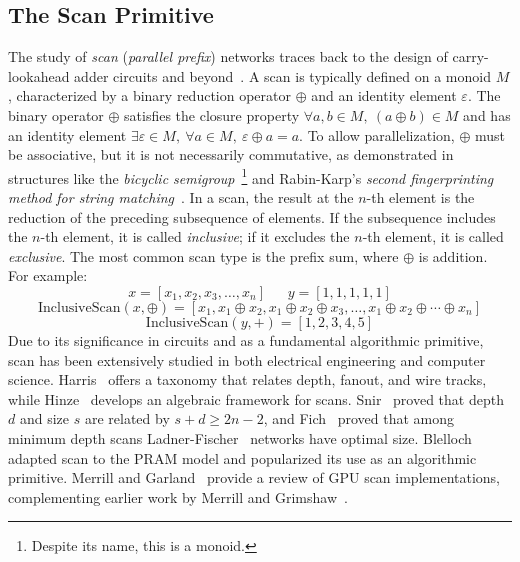 \documentclass[sigconf,screen]{acmart}
\begin{document}
\subsection{The Scan Primitive}
\label{sec:the-scan-primitive}
The study of \emph{scan} (\emph{parallel prefix}) networks traces back to the design of carry-lookahead adder circuits and beyond~\cite{5219801,10.5555/1098666}. A scan is typically defined on a monoid \( M \), characterized by a binary reduction operator \( \oplus \) and an identity element \( \varepsilon \). The binary operator \( \oplus \) satisfies the closure property \( \forall a, b \in M, \ (a \oplus b) \in M \) and has an identity element \( \exists \varepsilon \in M, \ \forall a \in M, \ \varepsilon \oplus a = a \). To allow parallelization, \( \oplus \) must be associative, but it is not necessarily commutative, as demonstrated in structures like the \emph{bicyclic semigroup}~\cite{Clifford1961}\footnote{Despite its name, this is a monoid.} and Rabin-Karp's \emph{second fingerprinting method for string matching}~\cite[Section 6]{Karp:1987:ERP}. In a scan, the result at the \( n \)-th element is the reduction of the preceding subsequence of elements. If the subsequence includes the \( n \)-th element, it is called \emph{inclusive}; if it excludes the \( n \)-th element, it is called \emph{exclusive}. The most common scan type is the prefix sum, where \( \oplus \) is addition. For example:
\[
  x = [x_1, x_2, x_3, \dots, x_n] \ \ \ \ \ \ \ y = [1, 1, 1, 1, 1]
\]
\[
  \text{InclusiveScan}(x, \oplus) = [x_1, x_1 \oplus x_2, x_1 \oplus x_2 \oplus x_3, \dots, x_1 \oplus x_2 \oplus \cdots \oplus x_n]
\]
\[
  \text{InclusiveScan}(y, +) = [1, 2, 3, 4, 5]
\]
Due to its significance in circuits and as a fundamental algorithmic primitive, scan has been extensively studied in both electrical engineering and computer science. Harris~\cite{1292373} offers a taxonomy that relates depth, fanout, and wire tracks, while Hinze~\cite{10.1007/978-3-540-27764-4_11} develops an algebraic framework for scans. Snir~\cite{10.1016/0196-67748690003-9} proved that depth $d$ and size $s$ are related by $s + d \ge 2n - 2$, and Fich~\cite{10.1145/800061.808738} proved that among minimum depth scans Ladner-Fischer~\cite{10.1145/322217.322232} networks have optimal size. Blelloch~\cite{Blelloch:1989:SAP} adapted scan to the PRAM model and popularized its use as an algorithmic primitive. Merrill and Garland~\cite{Merrill2016} provide a review of GPU scan implementations, complementing earlier work by Merrill and Grimshaw~\cite{Merrill2009}.
\end{document}
